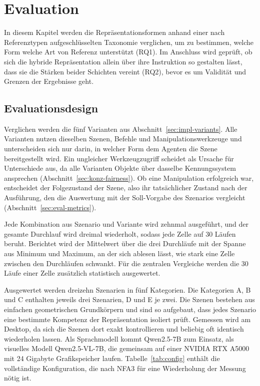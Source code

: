 
\chapter{Evaluation}
\label{ch:evaluation}

In diesem Kapitel werden die Repräsentationsformen anhand einer nach Referenztypen aufgeschlüsselten Taxonomie verglichen, um zu bestimmen, welche Form welche Art von Referenz unterstützt (RQ1).
Im Anschluss wird geprüft, ob sich die hybride Repräsentation allein über ihre Instruktion so gestalten lässt, dass sie die Stärken beider Schichten vereint (RQ2), bevor es um Validität und Grenzen der Ergebnisse geht.


\section{Evaluationsdesign}
\label{sec:eval-design}

Verglichen werden die fünf Varianten aus Abschnitt~\ref{sec:impl-variants}.
Alle Varianten nutzen dieselben Szenen, Befehle und Manipulationswerkzeuge und unterscheiden sich nur darin, in welcher Form dem Agenten die Szene bereitgestellt wird.
Ein ungleicher Werkzeugzugriff scheidet als Ursache für Unterschiede aus, da alle Varianten Objekte über dasselbe Kennungssystem ansprechen (Abschnitt~\ref{sec:konz-fairness}).
Ob eine Manipulation erfolgreich war, entscheidet der Folgezustand der Szene, also ihr tatsächlicher Zustand nach der Ausführung, den die Auswertung mit der Soll-Vorgabe des Szenarios vergleicht (Abschnitt~\ref{sec:eval-metrics}).

Jede Kombination aus Szenario und Variante wird zehnmal ausgeführt, und der gesamte Durchlauf wird dreimal wiederholt, sodass jede Zelle auf 30 Läufen beruht.
Berichtet wird der Mittelwert über die drei Durchläufe mit der Spanne aus Minimum und Maximum, an der sich ablesen lässt, wie stark eine Zelle zwischen den Durchläufen schwankt.
Für die zentralen Vergleiche werden die 30 Läufe einer Zelle zusätzlich statistisch ausgewertet.

Ausgewertet werden dreizehn Szenarien in fünf Kategorien.
Die Kategorien A, B und C enthalten jeweils drei Szenarien, D und E je zwei.
Die Szenen bestehen aus einfachen geometrischen Grundkörpern und sind so aufgebaut, dass jedes Szenario eine bestimmte Kompetenz der Repräsentation isoliert prüft.
Gemessen wird am Desktop, da sich die Szenen dort exakt kontrollieren und beliebig oft identisch wiederholen lassen.
Als Sprachmodell kommt Qwen2.5-7B zum Einsatz, als visuelles Modell Qwen2.5-VL-7B, die gemeinsam auf einer NVIDIA RTX A5000 mit 24 Gigabyte Grafikspeicher laufen.
Tabelle~\ref{tab:config} enthält die vollständige Konfiguration, die nach NFA3 für eine Wiederholung der Messung nötig ist.

